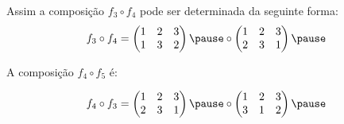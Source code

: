 \documentclass{beamer}
\begin{document}
    \begin{frame}
        Assim a composi\c{c}\~ao $f_3 \circ f_4$ pode ser determinada da seguinte forma:
        \[
            f_3\circ f_4 = \begin{pmatrix}
                    1 & 2 & 3\\
                    1 & 3 & 2
                \end{pmatrix} \pause \circ \begin{pmatrix}
                    1 & 2 & 3\\
                    2 & 3 & 1
                \end{pmatrix} \pause
        \]
    \end{frame}

    \begin{frame}
        A composi\c{c}\~ao $f_4 \circ f_5$ \'e:

        \[
            f_4\circ f_3 = \begin{pmatrix}
                    1 & 2 & 3\\
                    2 & 3 & 1
                \end{pmatrix} \pause \circ \begin{pmatrix}
                    1 & 2 & 3\\
                    3 & 1 & 2
                \end{pmatrix} \pause
        \]
    \end{frame}
\end{document}
